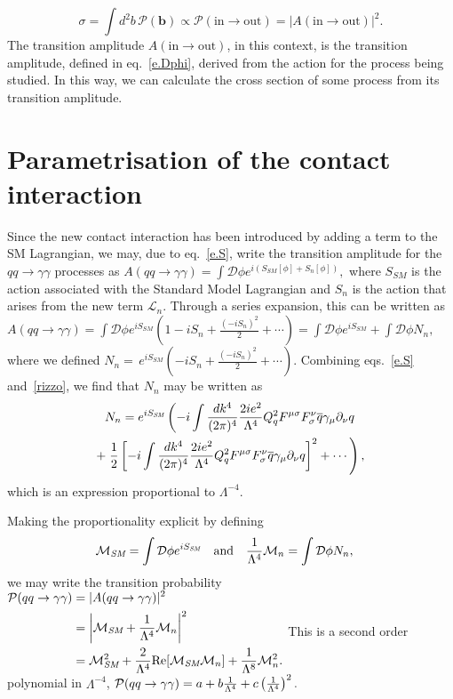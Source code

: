 \begin{edits}
\[\sigma=\int d^2b\,\mathcal P(\mathbf b)\propto\mathcal P(\text{in}\rightarrow\text{out})=\left|A(\text{in}\rightarrow\text{out})\right|^2.\]
The transition amplitude $A(\text{in}\rightarrow\text{out})$, in this context, is the transition amplitude, defined in eq.~\eqref{e.Dphi}, derived from the action for the process being studied. In this way, we can calculate the cross section of some process from its transition amplitude.

\section{Parametrisation of the contact interaction}
Since the new contact interaction has been introduced by adding a term to the SM Lagrangian, we may, due to eq.~\eqref{e.S}, write the transition amplitude for the $qq\rightarrow\gamma\gamma$ processes as
\(A(qq\rightarrow\gamma\gamma)=\int\mathcal D\phi e^{i(S_\textit{SM}[\phi]+S_n[\phi])},\)
where $S_\textit{SM}$ is the action associated with the Standard Model Lagrangian and $S_n$ is the action that arises from the new term $\mathcal L_n$. Through a series expansion, this can be written as
\(A(qq\rightarrow\gamma\gamma)=\int\mathcal D\phi e^{iS_\textit{SM}}\left(1-iS_n+\frac{(-iS_n)^2}{2}+\cdots\right)=\int\mathcal D\phi e^{iS_\textit{SM}}+\int\mathcal D\phi N_n,\)
where we defined
\(N_n=\,e^{iS_\textit{SM}}\left(-iS_n+\frac{(-iS_n)^2}{2}+\cdots\right).\)
Combining eqs.~\eqref{e.S} and~\eqref{rizzo}, we find that $N_n$ may be written as
\begin{multline}
N_n=e^{iS_\textit{SM}}\left(-i\int\frac{dk^4}{(2\pi)^4}\frac{2ie^2}{\Lambda^4}Q_q^2F^{\mu\sigma}F^\nu_\sigma\overline{q}\gamma_\mu\partial_\nu q\right.\\
+\left.\frac{1}{2}\left[-i\int\frac{dk^4}{(2\pi)^4}\frac{2ie^2}{\Lambda^4}Q_q^2F^{\mu\sigma}F^\nu_\sigma\overline{q}\gamma_\mu\partial_\nu q\right]^2+\cdots\right),
\end{multline}
which is an expression proportional to $\Lambda^{-4}$.

Making the proportionality explicit by defining
\begin{align}
\mathcal M_\textit{SM} &= \int\mathcal D\phi e^{iS_\textit{SM}}
&\text{and}&&
\frac{1}{\Lambda^{4}}\mathcal M_n &= \int\mathcal D\phi N_n,
\end{align}
we may write the transition probability
\(\begin{split}
\mathcal P(qq\rightarrow\gamma\gamma) &=|A(qq\rightarrow\gamma\gamma)|^2\\
&=\left|\mathcal M_\textit{SM}+\frac{1}{\Lambda^4}\mathcal M_n\right|^2\\
&=\mathcal M_\textit{SM}^2+\frac{2}{\Lambda^4}\text{Re}[\mathcal M_\textit{SM}\mathcal M_n]+\frac{1}{\Lambda^8}\mathcal M_n^2.
\end{split}\)
This is a second order polynomial in $\Lambda^{-4}$,
\(\mathcal P(qq\rightarrow\gamma\gamma)=a+b\frac{1}{\Lambda^4}+c\left(\frac{1}{\Lambda^4}\right)^2.\label{param}\)


\end{edits}
